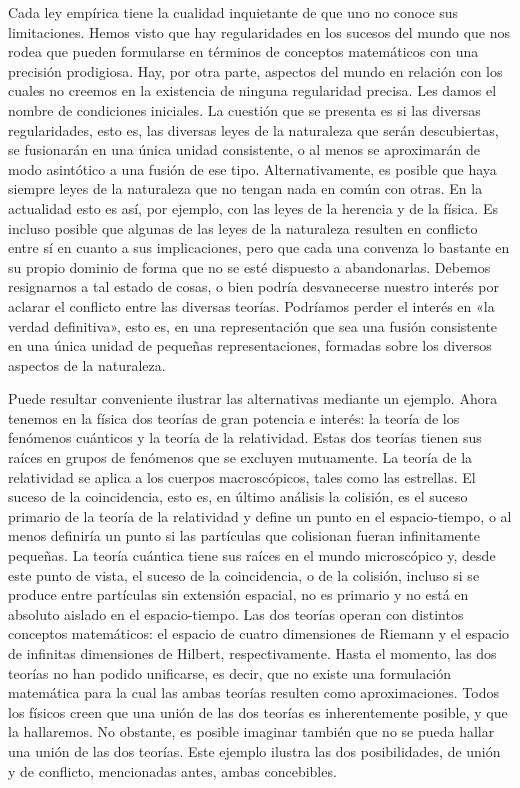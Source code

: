 \documentclass[a4paper, 12pt]{article}
\begin{document}
Cada ley empírica tiene la cualidad inquietante de que uno no conoce sus limitaciones. Hemos visto que hay regularidades en los sucesos del mundo que nos rodea que pueden formularse en términos de conceptos matemáticos con una precisión prodigiosa. Hay, por otra parte, aspectos del mundo en relación con los cuales no creemos en la existencia de ninguna regularidad precisa. Les damos el nombre de condiciones iniciales. La cuestión que se presenta es si las diversas regularidades, esto es, las diversas leyes de la naturaleza que serán descubiertas, se fusionarán en una única unidad consistente, o al menos se aproximarán de modo asintótico a una fusión de ese tipo. Alternativamente, es posible que haya siempre leyes de la naturaleza que no tengan nada en común con otras. En la actualidad esto es así, por ejemplo, con las leyes de la herencia y de la física. Es incluso posible que algunas de las leyes de la naturaleza resulten en conflicto entre sí en cuanto a sus implicaciones, pero que cada una convenza lo bastante en su propio dominio de forma que no se esté dispuesto a abandonarlas. Debemos resignarnos a tal estado de cosas, o bien podría desvanecerse nuestro interés por aclarar el conflicto entre las diversas teorías. Podríamos perder el interés en «la verdad definitiva», esto es, en una representación que sea una fusión consistente en una única unidad de pequeñas representaciones, formadas sobre los diversos aspectos de la naturaleza. 

Puede resultar conveniente ilustrar las alternativas mediante un ejemplo. Ahora tenemos en la física dos teorías de gran potencia e interés: la teoría de los fenómenos cuánticos y la teoría de la relatividad. Estas dos teorías tienen sus raíces en grupos de fenómenos que se excluyen mutuamente. La teoría de la relatividad se aplica a los cuerpos macroscópicos, tales como las estrellas. El suceso de la coincidencia, esto es, en último análisis la colisión, es el suceso primario de la teoría de la relatividad y define un punto en el espacio-tiempo, o al menos definiría un punto si las partículas que colisionan fueran infinitamente pequeñas. La teoría cuántica tiene sus raíces en el mundo microscópico y, desde este punto de vista, el suceso de la coincidencia, o de la colisión, incluso si se produce entre partículas sin extensión espacial, no es primario y no está en absoluto aislado en el espacio-tiempo. Las dos teorías operan con distintos conceptos matemáticos: el espacio de cuatro dimensiones de Riemann y el espacio de infinitas dimensiones de Hilbert, respectivamente. Hasta el momento, las dos teorías no han podido unificarse, es decir, que no existe una formulación matemática para la cual las ambas teorías resulten como aproximaciones. Todos los físicos creen que una unión de las dos teorías es inherentemente posible, y que la hallaremos. No obstante, es posible imaginar también que no se pueda hallar una unión de las dos teorías. Este ejemplo ilustra las dos posibilidades, de unión y de conflicto, mencionadas antes, ambas concebibles.
\end{document}
